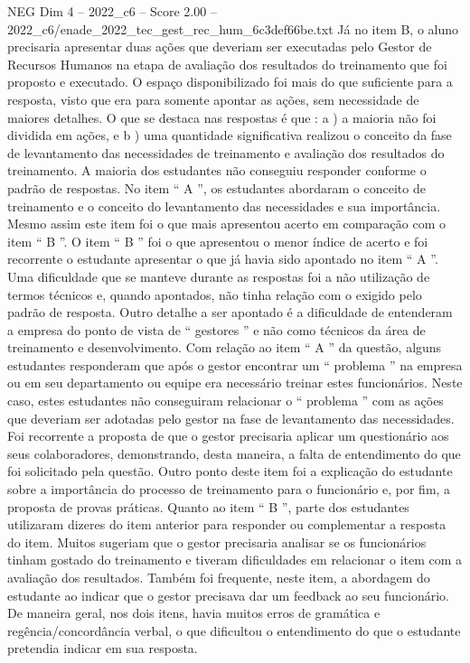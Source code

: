 \begin{textsample}{NEG Dim 4 – 2022\_c6 – Score 2.00 – 2022\_c6/enade\_2022\_tec\_gest\_rec\_hum\_6c3def66be.txt}
Já no item B, o aluno precisaria apresentar duas ações que deveriam ser executadas pelo Gestor de Recursos Humanos na etapa de avaliação dos resultados do treinamento que foi proposto e executado.
O espaço disponibilizado foi mais do que suficiente para a resposta, visto que era para somente apontar as ações, sem necessidade de maiores detalhes.
O que se destaca nas respostas é que : a ) a maioria não foi dividida em ações, e b ) uma quantidade significativa realizou o conceito da fase de levantamento das necessidades de treinamento e avaliação dos resultados do treinamento.
A maioria dos estudantes não conseguiu responder conforme o padrão de respostas.
No item “ A ”, os estudantes abordaram o conceito de treinamento e o conceito do levantamento das necessidades e sua importância.
Mesmo assim este item foi o que mais apresentou acerto em comparação com o item “ B ”.
O item “ B ” foi o que apresentou o menor índice de acerto e foi recorrente o estudante apresentar o que já havia sido apontado no item “ A ”.
Uma dificuldade que se manteve durante as respostas foi a não utilização de termos técnicos e, quando apontados, não tinha relação com o exigido pelo padrão de resposta.
Outro detalhe a ser apontado é a dificuldade de entenderam a empresa do ponto de vista de “ gestores ” e não como técnicos da área de treinamento e desenvolvimento.
Com relação ao item “ A ” da questão, alguns estudantes responderam que após o gestor encontrar um “ problema ” na empresa ou em seu departamento ou equipe era necessário treinar estes funcionários.
Neste caso, estes estudantes não conseguiram relacionar o “ problema ” com as ações que deveriam ser adotadas pelo gestor na fase de levantamento das necessidades.
Foi recorrente a proposta de que o gestor precisaria aplicar um questionário aos seus colaboradores, demonstrando, desta maneira, a falta de entendimento do que foi solicitado pela questão.
Outro ponto deste item foi a explicação do estudante sobre a importância do processo de treinamento para o funcionário e, por fim, a proposta de provas práticas.
Quanto ao item “ B ”, parte dos estudantes utilizaram dizeres do item anterior para responder ou complementar a resposta do item.
Muitos sugeriam que o gestor precisaria analisar se os funcionários tinham gostado do treinamento e tiveram dificuldades em relacionar o item com a avaliação dos resultados.
Também foi frequente, neste item, a abordagem do estudante ao indicar que o gestor precisava dar um feedback ao seu funcionário.
De maneira geral, nos dois itens, havia muitos erros de gramática e regência/concordância verbal, o que dificultou o entendimento do que o estudante pretendia indicar em sua resposta.

\end{textsample}
